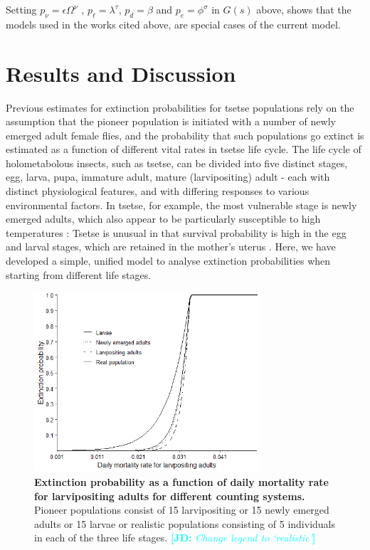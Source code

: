\documentclass[smallextended]{svjour3}
\newcommand{\comment}[3]{\textcolor{#1}{\textbf{[#2: }\textit{#3}\textbf{]}}}
\newcommand{\jd}[1]{\comment{cyan}{JD}{#1}}
\begin{document}
Setting  $ p_{\nu}= \epsilon \Omega^{\nu}$ , $p_{\ell} =\lambda^{\tau} $, $p_{d}=\beta$  and $p_{e} = \phi^{\sigma} $ in  $G(s)$ above,   shows that the models used in the works cited above, are special cases of the current model. 

\section{Results and Discussion}
\label{section8}

Previous estimates for extinction probabilities for tsetse populations rely on the assumption that the pioneer population is initiated with a number of newly emerged adult female flies, and the probability that such populations go extinct is estimated as a function of different vital rates in tsetse life cycle. The life cycle of holometabolous insects, such as tsetse, can be divided into five distinct stages, egg, larva, pupa, immature adult, mature (larvipositing) adult - each with distinct physiological features, and with differing responses to various environmental factors. In tsetse, for example, the most vulnerable stage is newly emerged adults, which also appear to be particularly susceptible to high temperatures \cite{Ackley2017a}: Tsetse is unusual in that survival probability is high in the egg and larval stages, which are retained in the mother's uterus \cite{Hargrove1999a}. Here, we have developed a simple, unified model to analyse extinction probabilities when starting from different life stages. 

\begin{figure}[h]
	\includegraphics[width=0.75\textwidth]{Extinction15individuals.png}
	\caption{{\bf Extinction probability as a function of daily mortality rate for larvipositing adults for different counting systems.}  Pioneer populations consist of 15 larvipositing or 15 newly emerged adults or 15 larvae or realistic populations consisting of 5 individuals in each of the three life stages. \jd{Change legend to `realistic'}}
	\label{ExtLarviposMort15indiv}
\end{figure}
\end{document}
